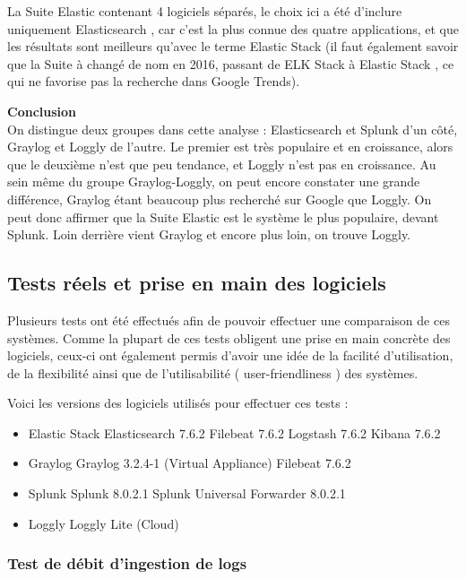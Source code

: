 \documentclass[paper=a4, fontsize=11pt]{scrartcl}
\begin{document}
La Suite Elastic contenant 4 logiciels séparés, le choix ici a été d'inclure uniquement \og Elasticsearch \fg, car c'est la plus connue des quatre applications, et que les résultats sont meilleurs qu'avec le terme \og Elastic Stack \fg (il faut également savoir que la Suite à changé de nom en 2016, passant de \og ELK Stack \fg à \og Elastic Stack \fg, ce qui ne favorise pas la recherche dans Google Trends).

\textbf{Conclusion} \\
On distingue deux groupes dans cette analyse : Elasticsearch et Splunk d'un côté, Graylog et Loggly de l'autre. Le premier est très populaire et en croissance, alors que le deuxième n'est que peu tendance, et Loggly n'est pas en croissance. Au sein même du groupe Graylog-Loggly, on peut encore constater une grande différence, Graylog étant beaucoup plus recherché sur Google que Loggly. On peut donc affirmer que la Suite Elastic est le système le plus populaire, devant Splunk. Loin derrière vient Graylog et encore plus loin, on trouve Loggly.

\subsection{Tests réels et prise en main des logiciels}

Plusieurs tests ont été effectués afin de pouvoir effectuer une comparaison de ces systèmes. Comme la plupart de ces tests obligent une prise en main concrète des logiciels, ceux-ci ont également permis d'avoir une idée de la facilité d'utilisation, de la flexibilité ainsi que de l'utilisabilité ( \og user-friendliness \fg) des systèmes.

Voici les versions des logiciels utilisés pour effectuer ces tests :

\begin{itemize}
    \item Elastic Stack
    \subitem Elasticsearch 7.6.2
    \subitem Filebeat 7.6.2
    \subitem Logstash 7.6.2
    \subitem Kibana 7.6.2
    \item Graylog
    \subitem Graylog 3.2.4-1 (Virtual Appliance)
    \subitem Filebeat 7.6.2
    \item Splunk
    \subitem Splunk 8.0.2.1
    \subitem Splunk Universal Forwarder 8.0.2.1
    \item Loggly
    \subitem Loggly Lite (Cloud)
\end{itemize}

\subsubsection{Test de débit d'ingestion de logs} \label{sss-testDebitIngestionLogs}
\end{document}
